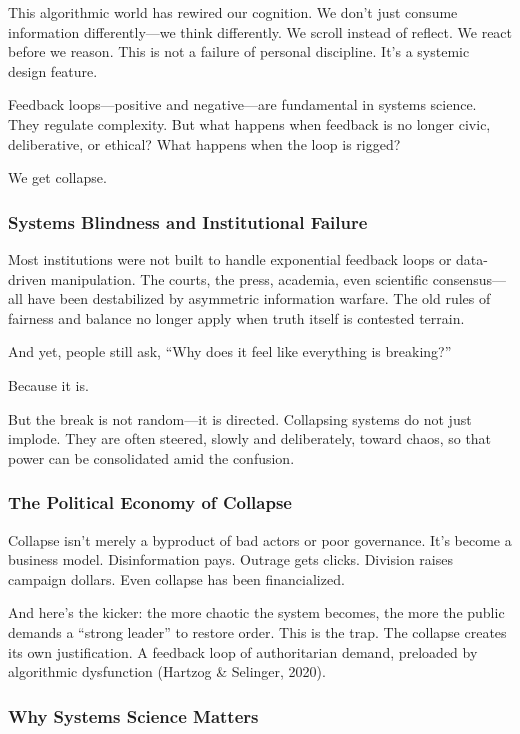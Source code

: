 This algorithmic world has rewired our cognition. We don't just consume
information differently---we think differently. We scroll instead of
reflect. We react before we reason. This is not a failure of personal
discipline. It's a systemic design feature.

Feedback loops---positive and negative---are fundamental in systems
science. They regulate complexity. But what happens when feedback is no
longer civic, deliberative, or ethical? What happens when the loop is
rigged?

We get collapse.

\subsubsection{Systems Blindness and Institutional
Failure}\label{systems-blindness-and-institutional-failure}

Most institutions were not built to handle exponential feedback loops or
data-driven manipulation. The courts, the press, academia, even
scientific consensus---all have been destabilized by asymmetric
information warfare. The old rules of fairness and balance no longer
apply when truth itself is contested terrain.

And yet, people still ask, ``Why does it feel like everything is
breaking?''

Because it is.

But the break is not random---it is directed. Collapsing systems do not
just implode. They are often steered, slowly and deliberately, toward
chaos, so that power can be consolidated amid the confusion.

\subsubsection{The Political Economy of
Collapse}\label{the-political-economy-of-collapse}

Collapse isn't merely a byproduct of bad actors or poor governance. It's
become a business model. Disinformation pays. Outrage gets clicks.
Division raises campaign dollars. Even collapse has been financialized.

And here's the kicker: the more chaotic the system becomes, the more the
public demands a ``strong leader'' to restore order. This is the trap.
The collapse creates its own justification. A feedback loop of
authoritarian demand, preloaded by algorithmic dysfunction (Hartzog \&
Selinger, 2020).

\subsubsection{Why Systems Science
Matters}\label{why-systems-science-matters}

